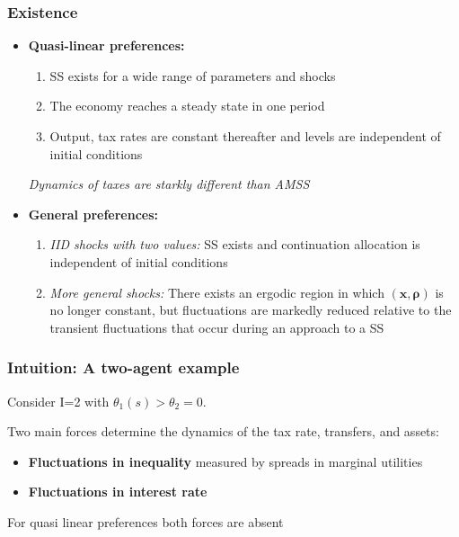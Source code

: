 \documentclass{beamer}
\begin{document}
\begin{frame}
\frametitle{Existence}
\begin{itemize}
 \item \textbf{Quasi-linear preferences:}
 \begin{enumerate}
                                           \item SS exists for a wide range of parameters and shocks
                                           \item The economy reaches a steady state in one period
                                           \item Output, tax rates are constant thereafter and levels are independent of initial conditions

\end{enumerate}
\emph{Dynamics of taxes are starkly different than AMSS}

 \item \textbf{General preferences:}
 \begin{enumerate}
 \item \emph{IID shocks with two values:} SS exists and continuation allocation is independent of initial conditions
 \item \emph{More general shocks:} There exists an ergodic region in which $\left( \bm{x},\bm{\rho} \right) $ is no longer constant, but  fluctuations are markedly reduced relative to the transient fluctuations that occur during an approach to  a SS
 \end{enumerate}
 \end{itemize}

\end{frame}


\begin{frame}
\frametitle{Intuition:  A two-agent example}

Consider I=2 with $\theta_1(s)>\theta_2=0$.

Two main forces determine the dynamics of the tax rate, transfers,  and assets:
\begin{itemize}
 \item \textbf{Fluctuations in inequality}  measured by spreads in marginal utilities
\item  \textbf{Fluctuations in interest rate}
\end{itemize}
For quasi linear preferences both forces are absent

\end{frame}
\end{document}
